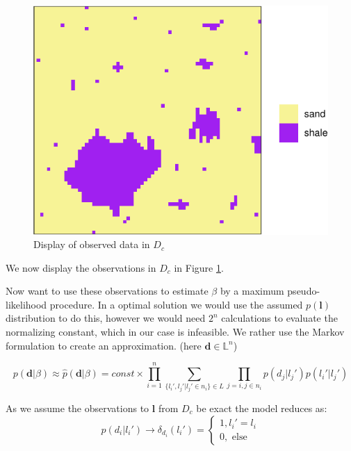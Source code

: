 \documentclass[]{article}
\newcommand{\vect}[1]{\ensuremath{\boldsymbol{\mathbf{#1}}}}
\begin{document}
\begin{figure}
\centering
\includegraphics{Exercise-3_files/figure-latex/fig1c1-1.pdf}
\caption{\label{fig:1c1}Display of observed data in \(D_c\)}
\end{figure}

We now display the observations in \(D_c\) in Figure \ref{fig:1c1}.

Now want to use these observations to estimate \(\beta\) by a maximum
pseudo-likelihood procedure. In a optimal solution we would use the
assumed \(p(\vect l)\) distribution to do this, however we would need
\(2^n\) calculations to evaluate the normalizing constant, which in our
case is infeasible. We rather use the Markov formulation to create an
approximation. (here \(\vect d \in \mathbb{L}^n\))

\begin{equation} \label{eq:ising}
    p(\vect d | \beta ) \approx \hat p(\vect d | \beta) = const \times \prod_{i = 1}^{n}\sum_{\lbrace l_i', l_j' | l_j' \in n_i \rbrace \in L }  \prod_{j = i, j \in n_i}p(d_j | l_j')p(l_i'|l_j')
\end{equation}

As we assume the observations to \(\vect l\) from \(D_c\) be exact the
model reduces as: \begin{equation}
p(d_i | l_i') \rightarrow \delta_{d_i}(l_i') = \begin{cases}
    1, l_i' = l_i \\ 
    0, \text{ else}
    \end{cases}
\end{equation}
\end{document}
